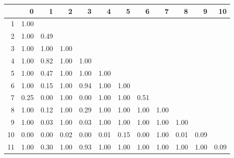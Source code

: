 \begin{tabular}{rrrrrrrrrrrr}
  \hline
 & 0 & 1 & 2 & 3 & 4 & 5 & 6 & 7 & 8 & 9 & 10 \\ 
  \hline
1 & 1.00 &  &  &  &  &  &  &  &  &  &  \\ 
  2 & 1.00 & 0.49 &  &  &  &  &  &  &  &  &  \\ 
  3 & 1.00 & 1.00 & 1.00 &  &  &  &  &  &  &  &  \\ 
  4 & 1.00 & 0.82 & 1.00 & 1.00 &  &  &  &  &  &  &  \\ 
  5 & 1.00 & 0.47 & 1.00 & 1.00 & 1.00 &  &  &  &  &  &  \\ 
  6 & 1.00 & 0.15 & 1.00 & 0.94 & 1.00 & 1.00 &  &  &  &  &  \\ 
  7 & 0.25 & 0.00 & 1.00 & 0.00 & 1.00 & 1.00 & 0.51 &  &  &  &  \\ 
  8 & 1.00 & 0.12 & 1.00 & 0.29 & 1.00 & 1.00 & 1.00 & 1.00 &  &  &  \\ 
  9 & 1.00 & 0.03 & 1.00 & 0.03 & 1.00 & 1.00 & 1.00 & 1.00 & 1.00 &  &  \\ 
  10 & 0.00 & 0.00 & 0.02 & 0.00 & 0.01 & 0.15 & 0.00 & 1.00 & 0.01 & 0.09 &  \\ 
  11 & 1.00 & 0.30 & 1.00 & 0.93 & 1.00 & 1.00 & 1.00 & 1.00 & 1.00 & 1.00 & 0.09 \\ 
   \hline
\end{tabular}

